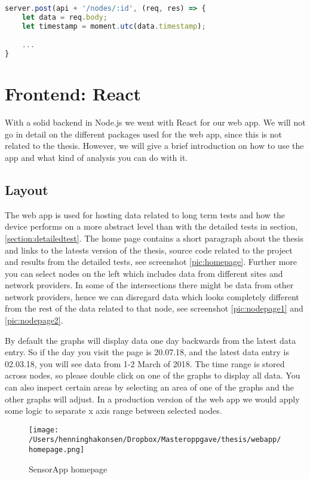 \documentclass[USenglish]{ifimaster}  %
\begin{document}
\begin{lstlisting}[caption={Simple moment example},label={code:moment},language=JavaScript]
server.post(api + '/nodes/:id', (req, res) => {
    let data = req.body;
    let timestamp = moment.utc(data.timestamp);

    ...
}
\end{lstlisting}

\section{Frontend: React}
With a solid backend in Node.js we went with React for our web app. We will not go in detail on the different packages used for the web app, since this is not related to the thesis. However, we will give a brief introduction on how to use the app and what kind of analysis you can do with it.

\subsection{Layout} \label{sssection:layout}
The web app is used for hosting data related to long term tests and how the device performs on a more abstract level than with the detailed tests in section, \vref{section:detailedtest}. The home page contains a short paragraph about the thesis and links to the latests version of the thesis, source code related to the project and results from the detailed tests, see screenshot \vref{pic:homepage}. Further more you can select nodes on the left which includes data from different sites and network providers. In some of the intersections there might be data from other network providers, hence we can disregard data which looks completely different from the rest of the data related to that node, see screenshot \vref{pic:nodepage1} and \vref{pic:nodepage2}.

By default the graphs will display data one day backwards from the latest data entry. So if the day you visit the page is 20.07.18, and the latest data entry is 02.03.18, you will see data from 1-2 March of 2018. The time range is stored across nodes, so please double click on one of the graphs to display all data. You can also inspect certain areas by selecting an area of one of the graphs and the other graphs will adjust. In a production version of the web app we would apply some logic to separate x axis range between selected nodes.

\begin{figure}[H]
  \centering
  \texttt{[image: /Users/henninghakonsen/Dropbox/Masteroppgave/thesis/webapp/homepage.png]}
  \caption{SensorApp homepage}
  \label{pic:homepage}
\end{figure}
\end{document}
